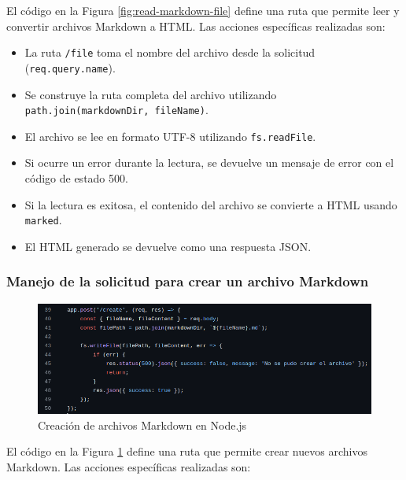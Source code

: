 \documentclass{article}
\begin{document}
El código en la Figura \ref{fig:read-markdown-file} define una ruta que permite leer y convertir archivos Markdown a HTML. Las acciones específicas realizadas son:
\begin{itemize}
    \item La ruta \texttt{/file} toma el nombre del archivo desde la solicitud (\texttt{req.query.name}).
    \item Se construye la ruta completa del archivo utilizando \texttt{path.join(markdownDir, fileName)}.
    \item El archivo se lee en formato UTF-8 utilizando \texttt{fs.readFile}.
    \item Si ocurre un error durante la lectura, se devuelve un mensaje de error con el código de estado 500.
    \item Si la lectura es exitosa, el contenido del archivo se convierte a HTML usando \texttt{marked}.
    \item El HTML generado se devuelve como una respuesta JSON.
\end{itemize}




\subsubsection{Manejo de la solicitud para crear un archivo Markdown}
\begin{figure}[h]
    \centering
    \includegraphics[width=0.9\linewidth]{latex//img/3.4.png}
    \caption{Creación de archivos Markdown en Node.js}
    \label{fig:create-markdown-file}
\end{figure}

El código en la Figura \ref{fig:create-markdown-file} define una ruta que permite crear nuevos archivos Markdown. Las acciones específicas realizadas son:
\end{document}
